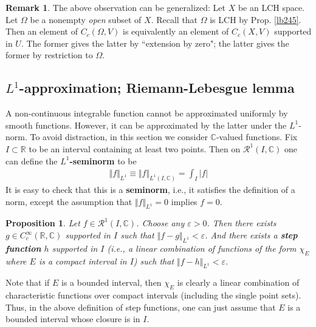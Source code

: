 \documentclass[12pt,b5paper,notitlepage]{article}
\theoremstyle{definition}
\newtheorem{rem}[df]{Remark}
\theoremstyle{plain}
\newtheorem{pp}[df]{Proposition}
\newcommand{\scr}{\mathscr}
\newcommand{\Cbb}{\mathbb C}
\newcommand{\Rbb}{\mathbb R}
\newcommand{\eps}{\varepsilon}
\numberwithin{equation}{section}
\begin{document}
\begin{rem}
The above observation can be generalized: Let $X$ be an LCH space. Let $\Omega$ be a nonempty \textit{open} subset of $X$. Recall that $\Omega$ is LCH by Prop. \ref{lb245}. Then an element of $C_c(\Omega,V)$ is equivalently an element of $C_c(X,V)$ supported in $U$. The former gives the latter by ``extension by zero"; the latter gives the former by restriction to $\Omega$.
\end{rem}





\subsection{$L^1$-approximation; Riemann-Lebesgue lemma}


A non-continuous integrable function cannot be approximated uniformly by smooth functions. However, it can be approximated by the latter under the $L^1$-norm. To avoid distraction, in this section we consider $\Cbb$-valued functions. Fix $I\subset\Rbb$ to be an interval containing at least two points. Then on $\scr R^1(I,\Cbb)$ one can define the \textbf{$L^1$-seminorm}  to be
\begin{align}
\Vert f\Vert_{L^1}\equiv\Vert f\Vert_{L^1(I,\Cbb)}=\int_I |f|
\end{align}
It is easy to check that this is a \textbf{seminorm}, i.e., it satisfies the definition of a norm, except the assumption that $\Vert f\Vert_{L^1}=0$ implies $f=0$.

\begin{pp}\label{lb445}
Let $f\in\scr R^1(I,\Cbb)$. Choose any $\eps>0$. Then there exists $g\in C_c^\infty(\Rbb,\Cbb)$ supported in $I$ such that $\Vert f-g\Vert_{L^1}<\eps$. And there exists a \textbf{step function} $h$ supported in $I$ (i.e., a linear combination of functions of the form $\chi_E$ where $E$ is a compact interval in $I$) such that $\Vert f-h\Vert_{L^1}<\eps$.
\end{pp}

Note that if $E$ is a bounded interval, then $\chi_E$ is clearly a linear combination of characteristic functions over compact intervals (including the single point sets). Thus, in the above definition of step functions, one can just assume that $E$ is a bounded interval whose closure is in $I$.
\end{document}
